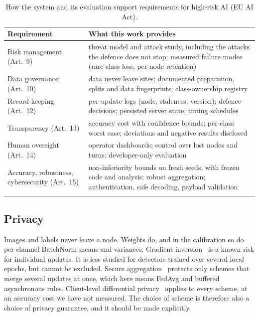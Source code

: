\documentclass[pdflatex,sn-mathphys-num]{sn-jnl}
\begin{document}
\begin{table}[t]
\caption{How the system and its evaluation support requirements for high-risk AI (EU AI Act).}\label{tab:trust}
\begin{tabular*}{\textwidth}{@{\extracolsep\fill}>{\raggedright\arraybackslash}p{}>{\raggedright\arraybackslash}p{}}
\toprule
Requirement & What this work provides \\
\midrule
Risk management (Art.~9) & threat model and attack study, including the attacks the defence does not stop; measured failure modes (rare-class loss, per-node retention) \\
Data governance (Art.~10) & data never leave sites; documented preparation, splits and data fingerprints; class-ownership registry \\
Record-keeping (Art.~12) & per-update logs (node, staleness, version); defence decisions; persisted server state; timing schedules \\
Transparency (Art.~13) & accuracy cost with confidence bounds; per-class worst case; deviations and negative results disclosed \\
Human oversight (Art.~14) & operator dashboards; control over lost nodes and turns; developer-only evaluation \\
Accuracy, robustness, cybersecurity (Art.~15) & non-inferiority bounds on fresh seeds, with frozen code and analysis; robust aggregation; authentication, safe decoding, payload validation \\
\botrule
\end{tabular*}
\end{table}

\subsection{Privacy}
Images and labels never leave a node. Weights do, and in the calibration so do per-channel BatchNorm means and variances. Gradient inversion~\cite{zhu2019dlg,geiping2020inverting} is a known risk for individual updates. It is less studied for detectors trained over several local epochs, but cannot be excluded. Secure aggregation~\cite{bonawitz2017secagg} protects only schemes that merge several updates at once, which here means FedAvg and buffered asynchronous rules. Client-level differential privacy~\cite{mcmahan2018dp} applies to every scheme, at an accuracy cost we have not measured. The choice of scheme is therefore also a choice of privacy guarantee, and it should be made explicitly.
\end{document}
